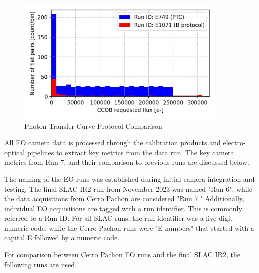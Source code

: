 \begin{figure}
\begin{centering}
\includegraphics[width=0.9\textwidth]{sections/figures/baselineCharacterization/PTC_BProtocol_Comparison.jpg}
	\caption{Photon Transfer Curve Protocol Comparison
\label{fig:PTC_BProtocol_Comparison}}
\end{centering}
\end{figure}


All EO camera data is processed through the
\href{https://github.com/lsst/cp_pipe}{calibration products} and
\href{https://github.com/lsst-camera-dh/eo_pipe/tree/main}{electro-optical}
pipelines to extract key metrics from the data run. The key camera
metrics from Run 7, and their comparison to previous runs are discussed
below.

The naming of the EO runs was established during initial camera
integration and testing. The final SLAC IR2 run from November 2023 was
named "Run 6", while the data acquisitions from Cerro Pachon are
considered "Run 7." Additionally, individual EO acquisitions are tagged
with a run identifier. This is commonly referred to a Run ID. For all
SLAC runs, the run identifier was a five digit numeric code, while the
Cerro Pachon runs were "E-numbers" that started with a capital E
followed by a numeric code.

For comparison between Cerro Pachon EO runs and the final SLAC IR2, the
following runs are used.

